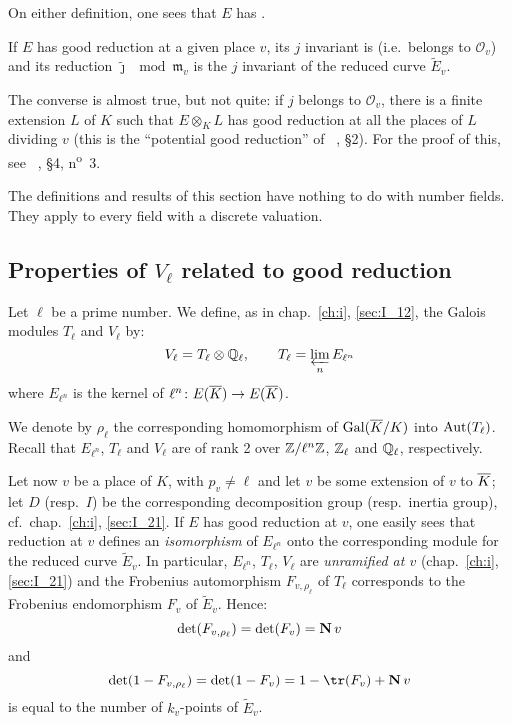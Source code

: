 On either definition, one sees that $E$ has .

If $E$ has good reduction at a given place $v$, its $j$ invariant is
 (i.e.\ belongs to $\mathcal{O}_v$) and its reduction
$\tilde\jmath \mod{\mathfrak{m}_v}$ is the $j$ invariant of the reduced curve
$\widetilde{E}_v$.

The converse is almost true, but not quite: if $j$ belongs to $\mathcal{O}_v$,
there is a finite extension $L$ of $K$ such that $E \otimes_K L$ has good
reduction at all the places of $L$ dividing $v$ (this is the ``potential good
reduction'' of \citeauthor{32}~\cite{32}, \S 2). For the proof of this, see
\citeauthor{29}~\cite{29}, \S 4, n\textsuperscript{o}~3.

\begin{obs}
The definitions and results of this section have nothing to do with number
fields. They apply to every field with a discrete valuation.
\end{obs}

\subsection{Properties of \texorpdfstring{$V_\ell$}{Vℓ} related to good
reduction}\label{sec:IV_13}
Let $\ell$ be a prime number. We define, as in chap.~\ref{ch:i},
\ref{sec:I_12}, the Galois modules $T_\ell$ and $V_\ell$ by:
\[
	V_\ell = T_\ell \otimes \mathbb{Q}_\ell, \qquad T_\ell = \varprojlim_n E_{\ell^n}
\]
where $E_{\ell^n}$ is the kernel of $\ell^n \colon E(\overline{K}) \to E(\overline{K})$.
\dpage

We denote by $\rho_\ell$ the corresponding homomorphism of $\operatorname{Gal}(\overline{K}/K)$
into $\operatorname{Aut}(T_\ell)$. Recall that $E_{\ell^n}$, $T_\ell$ and $V_\ell$ are of
rank 2 over $\mathbb{Z}/\ell^n\mathbb{Z}$, $\mathbb{Z}_\ell$ and $\mathbb{Q}_\ell$, respectively.

Let now $v$ be a place of $K$, with $p_v \ne \ell$ and let $v$ be some
extension of $v$ to $\overline{K}$; let $D$ (resp.\ $I$) be the corresponding
decomposition group (resp.\ inertia group), cf.\ chap.~\ref{ch:i},
\ref{sec:I_21}. If $E$ has good reduction at $v$, one easily sees that
reduction at $v$ defines an \emph{isomorphism} of $E_{\ell^n}$ onto the
corresponding module for the reduced curve $\widetilde{E}_v$. In particular,
$E_{\ell^n}$, $T_\ell$, $V_\ell$ are \emph{unramified at $v$}
(chap.~\ref{ch:i}, \ref{sec:I_21}) and the Frobenius automorphism $F_{v,
\rho_\ell}$ of $T_\ell$ corresponds to the Frobenius endomorphism $F_v$ of
$\widetilde{E}_v$. Hence: 
\[
	\det(F_{v, \rho_\ell}) = \det(F_v) = \operatorname{\mathbf{N}} v
\]
and
\[
	\det(1 - F_{v, \rho_\ell}) = \det(1 - F_v) = 1 - \tr(F_v) + \numnorm v
\]
is equal to the number of $k_v$-points of $\widetilde{E}_v$.

